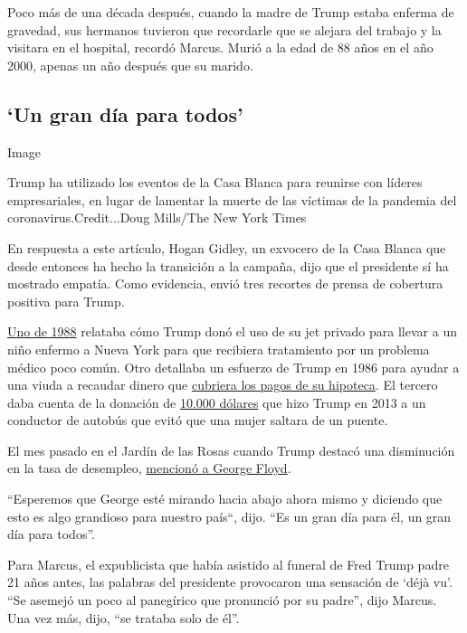 Poco más de una década después, cuando la madre de Trump estaba enferma
de gravedad, sus hermanos tuvieron que recordarle que se alejara del
trabajo y la visitara en el hospital, recordó Marcus. Murió a la edad de
88 años en el año 2000, apenas un año después que su marido.

\hypertarget{un-gran-duxeda-para-todos}{%
\subsection{`Un gran día para todos'}\label{un-gran-duxeda-para-todos}}

Image

Trump ha utilizado los eventos de la Casa Blanca para reunirse con
líderes empresariales, en lugar de lamentar la muerte de las víctimas de
la pandemia del coronavirus.Credit...Doug Mills/The New York Times

En respuesta a este artículo, Hogan Gidley, un exvocero de la Casa
Blanca que desde entonces ha hecho la transición a la campaña, dijo que
el presidente sí ha mostrado empatía. Como evidencia, envió tres
recortes de prensa de cobertura positiva para Trump.

\href{https://www.jta.org/1988/07/20/archive/orthodox-child-with-rare-ailment-is-rescued-aboard-tycoons-jet}{Uno
de 1988} relataba cómo Trump donó el uso de su jet privado para llevar a
un niño enfermo a Nueva York para que recibiera tratamiento por un
problema médico poco común. Otro detallaba un esfuerzo de Trump en 1986
para ayudar a una viuda a recaudar dinero que
\href{https://apnews.com/24c831825e0dab47d51d8d25bffe45f5}{cubriera los
pagos de su hipoteca}. El tercero daba cuenta de la donación de
\href{https://www.aol.com/2013/11/08/trump-gift-barton-buffalo/}{10.000
dólares} que hizo Trump en 2013 a un conductor de autobús que evitó que
una mujer saltara de un puente.

El mes pasado en el Jardín de las Rosas cuando Trump destacó una
disminución en la tasa de desempleo,
\href{https://www.nytimes.com/2020/06/05/us/politics/trump-jobs-report-george-floyd.html}{mencionó
a George Floyd}.

``Esperemos que George esté mirando hacia abajo ahora mismo y diciendo
que esto es algo grandioso para nuestro país``, dijo. ``Es un gran día
para él, un gran día para todos''.

Para Marcus, el expublicista que había asistido al funeral de Fred Trump
padre 21 años antes, las palabras del presidente provocaron una
sensación de `déjà vu'. ``Se asemejó un poco al panegírico que pronunció
por su padre'', dijo Marcus. Una vez más, dijo, ``se trataba solo de
él''.

